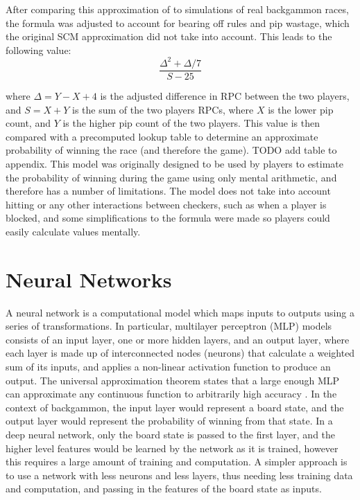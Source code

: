 After comparing this approximation of to simulations of real backgammon races, the formula was adjusted to account for bearing off rules and pip wastage, which the original SCM approximation did not take into account. This leads to the following value:
\begin{equation}
\label{eq:d2s}
    \frac{\Delta^2 + \Delta / 7}{S - 25}
\end{equation}


where $\Delta = Y - X + 4$ is the adjusted difference in RPC between the two players, and $S = X + Y$ is the sum of the two players RPCs, where $X$ is the lower pip count, and $Y$ is the higher pip count of the two players. 
This value is then compared with a precomputed lookup table to determine an approximate probability of winning the race (and therefore the game). TODO add table to appendix.
This model was originally designed to be used by players to estimate the probability of winning during the game using only mental arithmetic, and therefore has a number of limitations. The model does not take into account hitting or any other interactions between checkers, such as when a player is blocked, and some simplifications to the formula were made so players could easily calculate values mentally.


\section{Neural Networks} 

A neural network is a computational model which maps inputs to outputs using a series of transformations.
In particular, multilayer perceptron (MLP) models consists of an input layer, one or more hidden layers, and an output layer, where each layer is made up of interconnected nodes (neurons) that calculate a weighted sum of its inputs, and applies a non-linear activation function to produce an output. 
The universal approximation theorem states that a large enough MLP can approximate any continuous function to arbitrarily high accuracy \cite{Hornik1989}.
In the context of backgammon, the input layer would represent a board state, and the output layer would represent the probability of winning from that state.
In a deep neural network, only the board state is passed to the first layer, and the higher level features would be learned by the network as it is trained, however this requires a large amount of training and computation. 
A simpler approach is to use a network with less neurons and less layers, thus needing less training data and computation, and passing in the features of the board state as inputs.

